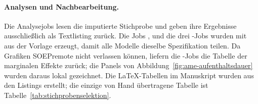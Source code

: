 \paragraph{Analysen und Nachbearbeitung.} Die Analysejobs lesen die imputierte Stichprobe und geben ihre Ergebnisse ausschließlich als Textlisting zurück. Die Jobs ,  und die drei -Jobs wurden mit  aus der Vorlage  erzeugt, damit alle Modelle dieselbe Spezifikation teilen. Da Grafiken SOEPremote nicht verlassen können, liefern die -Jobs die Tabelle der marginalen Effekte zurück; die Panels von Abbildung~\ref{fig:ame-aufenthaltsdauer} wurden daraus lokal gezeichnet. Die LaTeX-Tabellen im Manuskript wurden aus den Listings erstellt; die einzige von Hand übertragene Tabelle ist Tabelle~\ref{tab:stichprobenselektion}.

